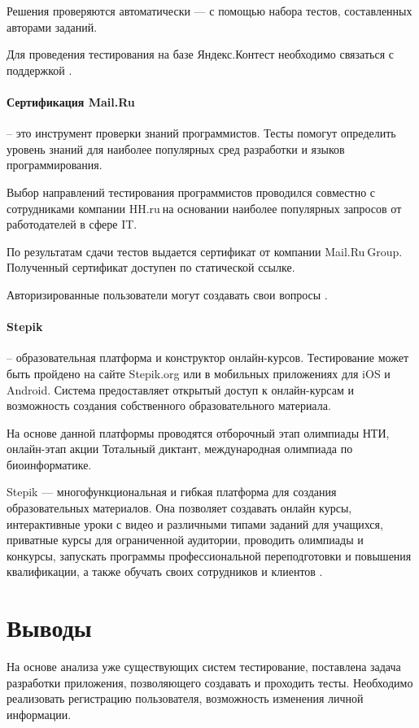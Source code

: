 Решения проверяются автоматически — с помощью набора тестов, составленных авторами заданий. 

Для проведения тестирования на базе Яндекс.Контест необходимо связаться с поддержкой \cite{yac}.

\paragraph{Сертификация Mail.Ru} -- это инструмент проверки знаний программистов. Тесты помогут определить уровень знаний для наиболее популярных сред разработки и языков программирования. 

Выбор направлений тестирования программистов проводился совместно с сотрудниками компании HH.ru на основании наиболее популярных запросов от работодателей в сфере IT.

По результатам сдачи тестов выдается сертификат от компании Mail.Ru Group. Полученный сертификат доступен по статической ссылке.

Авторизированные пользователи могут создавать свои вопросы \cite{certm}. 

\paragraph{Stepik} -- образовательная платформа и конструктор онлайн-курсов. Тестирование может быть пройдено на сайте Stepik.org или в мобильных приложениях для iOS и Android. Система предоставляет открытый доступ к онлайн-курсам и возможность создания собственного образовательного материала.

На основе данной платформы проводятся отборочный этап олимпиады НТИ, онлайн-этап акции Тотальный диктант, международная олимпиада по биоинформатике.

Stepik — многофункциональная и гибкая платформа для создания образовательных материалов. Она позволяет создавать онлайн курсы, интерактивные уроки с видео и различными типами заданий для учащихся, приватные курсы для ограниченной аудитории, проводить олимпиады и конкурсы, запускать программы профессиональной переподготовки и повышения квалификации, а также обучать своих сотрудников и клиентов \cite{stepik}. 


\section{Выводы} 
На основе анализа уже существующих систем тестирование, поставлена задача разработки приложения, позволяющего создавать и проходить тесты. Необходимо реализовать регистрацию пользователя, возможность изменения личной информации. 


